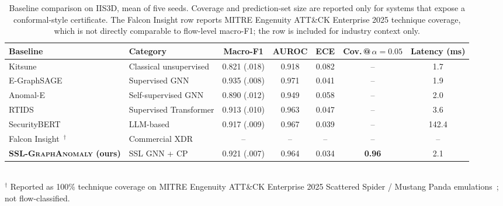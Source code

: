\documentclass[journal,twoside]{IEEEtran}
\begin{document}
\begin{table}[t]
\centering
\caption{Baseline comparison on IIS3D, mean of five seeds. Coverage and
prediction-set size are reported only for systems that expose a
conformal-style certificate. The Falcon Insight row reports MITRE
Engenuity ATT\&CK Enterprise 2025 technique coverage, which is not
directly comparable to flow-level macro-F1; the row is included for
industry context only.}
\label{tab:baselines}
\footnotesize
\setlength{\tabcolsep}{4pt}
\begin{tabular}{l l c c c c c}
\toprule
\textbf{Baseline} & \textbf{Category} & \textbf{Macro-F1} & \textbf{AUROC} & \textbf{ECE} & \textbf{Cov.\,@\,$\alpha{=}0.05$} & \textbf{Latency (ms)} \\
\midrule
Kitsune~\cite{mirsky2018kitsune}            & Classical unsupervised        & 0.821 (.018) & 0.918 & 0.082 & --   & 1.7 \\
E-GraphSAGE~\cite{lo2022egraphsage}          & Supervised GNN                 & 0.935 (.008) & 0.971 & 0.041 & --   & 1.9 \\
Anomal-E~\cite{caville2022anomale}           & Self-supervised GNN            & 0.890 (.012) & 0.949 & 0.058 & --   & 2.0 \\
RTIDS~\cite{wu2022rtids}                     & Supervised Transformer         & 0.913 (.010) & 0.963 & 0.047 & --   & 3.6 \\
SecurityBERT~\cite{ferrag2024securitybert}   & LLM-based                      & 0.917 (.009) & 0.967 & 0.039 & --   & 142.4 \\
Falcon Insight~\cite{crowdstrike2025mitre}$^\dagger$ & Commercial XDR        & --           & --    & --    & --   & -- \\
\textbf{\textsc{SSL-GraphAnomaly} (ours)}    & SSL GNN + CP                   & 0.921 (.007) & 0.964 & 0.034 & \textbf{0.96} & 2.1 \\
\bottomrule
\end{tabular}\\[2pt]
{\footnotesize $^\dagger$ Reported as 100\% technique coverage on MITRE
Engenuity ATT\&CK Enterprise 2025 Scattered Spider / Mustang Panda
emulations~\cite{crowdstrike2025mitre}; not flow-classified.}
\end{table}
\end{document}
